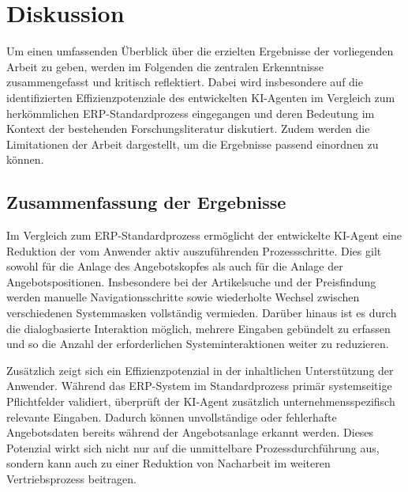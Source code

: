 \section{Diskussion}
Um einen umfassenden Überblick über die erzielten Ergebnisse der vorliegenden Arbeit zu geben, werden im Folgenden die zentralen Erkenntnisse zusammengefasst und kritisch reflektiert. Dabei wird insbesondere auf die identifizierten Effizienzpotenziale des entwickelten \ac{KI}-Agenten im Vergleich zum herkömmlichen \ac{ERP}-Standardprozess eingegangen und deren Bedeutung im Kontext der bestehenden Forschungsliteratur diskutiert. Zudem werden die Limitationen der Arbeit dargestellt, um die Ergebnisse passend einordnen zu können.
\subsection{Zusammenfassung der Ergebnisse}

Im Vergleich zum \ac{ERP}-Standardprozess ermöglicht der entwickelte \ac{KI}-Agent eine Reduktion der vom Anwender aktiv auszuführenden Prozessschritte. Dies gilt sowohl für die Anlage des Angebotskopfes als auch für die Anlage der Angebotspositionen. Insbesondere bei der Artikelsuche und der Preisfindung werden manuelle Navigationsschritte sowie wiederholte Wechsel zwischen verschiedenen Systemmasken vollständig vermieden. Darüber hinaus ist es durch die dialogbasierte Interaktion möglich, mehrere Eingaben gebündelt zu erfassen und so die Anzahl der erforderlichen Systeminteraktionen weiter zu reduzieren. 

Zusätzlich zeigt sich ein Effizienzpotenzial in der inhaltlichen Unterstützung der Anwender. Während das \ac{ERP}-System im Standardprozess primär systemseitige Pflichtfelder validiert, überprüft der \ac{KI}-Agent zusätzlich unternehmensspezifisch relevante Eingaben. Dadurch können unvollständige oder fehlerhafte Angebotsdaten bereits während der Angebotsanlage erkannt werden. Dieses Potenzial wirkt sich nicht nur auf die unmittelbare Prozessdurchführung aus, sondern kann auch zu einer Reduktion von Nacharbeit im weiteren Vertriebsprozess beitragen.

